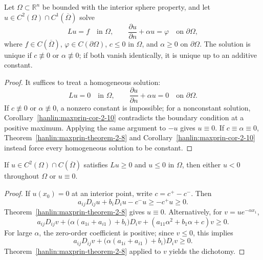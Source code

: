 \begin{corollary}\label{hanlin:maxprin-cor-2-11}
Let $\Omega\subset\mathbb{R}^n$ be bounded with the interior sphere property,
and let $u\in C^2(\Omega)\cap C^1(\overline\Omega)$ solve
\[
Lu=f\quad\text{in }\Omega,
\qquad
\frac{\partial u}{\partial n}+\alpha u=\varphi
\quad\text{on }\partial\Omega,
\]
where $f\in C(\overline\Omega)$, $\varphi\in C(\partial\Omega)$, $c\le0$ in
$\Omega$, and $\alpha\ge0$ on $\partial\Omega$. The solution is unique if
$c\not\equiv0$ or $\alpha\not\equiv0$; if both vanish identically, it is unique
up to an additive constant.
\end{corollary}
\begin{proof}
\sketch It suffices to treat a homogeneous solution:
\[
Lu=0\quad\text{in }\Omega,
\qquad
\frac{\partial u}{\partial n}+\alpha u=0
\quad\text{on }\partial\Omega.
\]
If $c\not\equiv0$ or $\alpha\not\equiv0$, a nonzero constant is impossible; for
a nonconstant solution, Corollary~\ref{hanlin:maxprin-cor-2-10} contradicts the
boundary condition at a positive maximum. Applying the same argument to $-u$
gives $u\equiv0$. If $c\equiv\alpha\equiv0$, Theorem~\ref{hanlin:maxprin-theorem-2-8}
and Corollary~\ref{hanlin:maxprin-cor-2-10} instead force every homogeneous
solution to be constant.
\end{proof}

\begin{theorem}\label{hanlin:maxprin-theorem-2-12}
If $u\in C^2(\Omega)\cap C(\overline\Omega)$ satisfies $Lu\ge0$ and $u\le0$ in
$\Omega$, then either $u<0$ throughout $\Omega$ or $u\equiv0$.
\end{theorem}
\begin{proof}
\sketch If $u(x_0)=0$ at an interior point, write $c=c^+-c^-$. Then
\[
a_{ij}D_{ij}u+b_iD_iu-c^-u\ge -c^+u\ge 0.
\]
Theorem~\ref{hanlin:maxprin-theorem-2-8} gives $u\equiv0$. Alternatively, for
$v=ue^{-\alpha x_1}$,
\[
a_{ij}D_{ij}v+\bigl(\alpha(a_{1i}+a_{i1})+b_i\bigr)D_iv+(a_{11}\alpha^2+b_1\alpha+c)v\ge 0.
\]
For large $\alpha$, the zero-order coefficient is positive; since $v\le0$, this
implies
\[
a_{ij}D_{ij}v+\bigl(\alpha(a_{1i}+a_{i1})+b_i\bigr)D_iv\ge 0.
\]
Theorem~\ref{hanlin:maxprin-theorem-2-8} applied to $v$ yields the dichotomy.
\end{proof}

